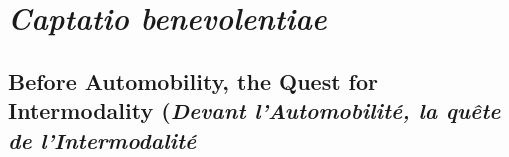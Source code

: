 
\cleardoublepage
\section*{\textsl{Captatio benevolentiae}
    \label{body:mt180}
    }

\subsection*{Before Automobility, the Quest for Intermodality (\textsl{Devant l'Automobilité, la quête de l'Intermodalité}}
    
